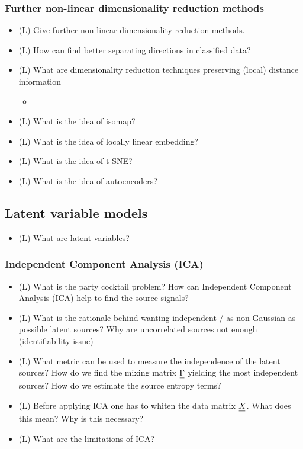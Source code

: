 \subsubsection*{Further non-linear dimensionality reduction methods}
\begin{itemize}
    \item (L) Give further non-linear dimensionality reduction methods.
    \item (L) How can find better separating directions in classified data?
    \item (L) What are dimensionality reduction techniques preserving (local) distance information
    \begin{itemize}
        \item {}
    \end{itemize}
    \item (L) What is the idea of isomap?
    \item (L) What is the idea of locally linear embedding?
    \item (L) What is the idea of t-SNE?
    \item (L) What is the idea of autoencoders?
\end{itemize}

\subsection*{Latent variable models}

\begin{itemize}
    \item (L) What are latent variables?
\end{itemize}

\subsubsection*{Independent Component Analysis (ICA)}

\begin{itemize}
    \item (L) What is the party cocktail problem? How can Independent Component Analysis (ICA) help to find the source signals?
    \item (L) What is the rationale behind wanting independent / as non-Gaussian as possible latent sources? Why are uncorrelated sources not enough (identifiability issue)
    \item (L) What metric can be used to measure the independence of the latent sources? How do we find the 
    mixing matrix $\mat{\Gamma}$ yielding the most independent sources? How do we estimate the source entropy terms?
    \item (L) Before applying ICA one has to whiten the data matrix $\mat{X}$. What does this mean? Why is this necessary?
    \item (L) What are the limitations of ICA?
\end{itemize}